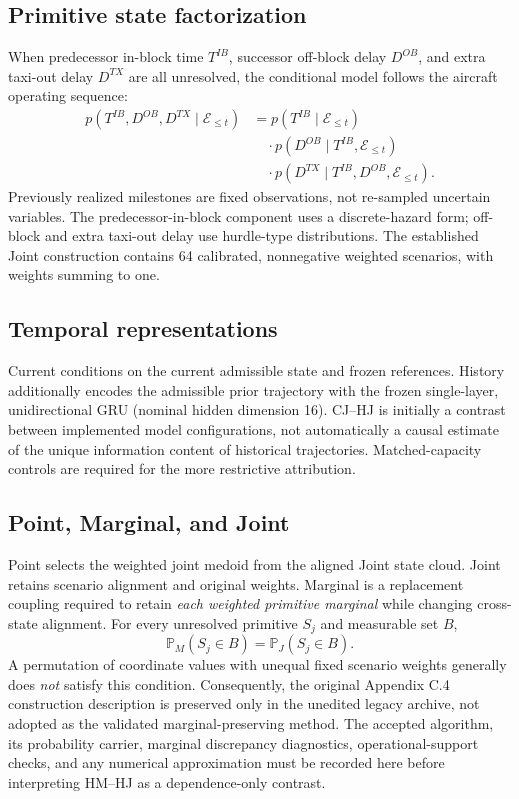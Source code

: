 \documentclass[10pt,a4paper]{article}
\newcommand{\Prob}{\mathbb P}
\numberwithin{equation}{section}
\begin{document}
\subsection{Primitive state factorization}
When predecessor in-block time $T^{IB}$, successor off-block delay $D^{OB}$, and extra taxi-out delay $D^{TX}$ are all unresolved, the conditional model follows the aircraft operating sequence:
\begin{equation}
\begin{aligned}
p(T^{IB},D^{OB},D^{TX}\mid\mathcal E_{\le t})
&=p(T^{IB}\mid\mathcal E_{\le t})\\
&\quad\cdot p(D^{OB}\mid T^{IB},\mathcal E_{\le t})\\
&\quad\cdot p(D^{TX}\mid T^{IB},D^{OB},\mathcal E_{\le t}).
\end{aligned}\label{eq:sup_state_factorization}
\end{equation}
Previously realized milestones are fixed observations, not re-sampled uncertain variables. The predecessor-in-block component uses a discrete-hazard form; off-block and extra taxi-out delay use hurdle-type distributions. The established Joint construction contains 64 calibrated, nonnegative weighted scenarios, with weights summing to one.

\subsection{Temporal representations}
Current conditions on the current admissible state and frozen references. History additionally encodes the admissible prior trajectory with the frozen single-layer, unidirectional GRU (nominal hidden dimension 16). CJ--HJ is initially a contrast between implemented model configurations, not automatically a causal estimate of the unique information content of historical trajectories. Matched-capacity controls are required for the more restrictive attribution.

\subsection{Point, Marginal, and Joint}
Point selects the weighted joint medoid from the aligned Joint state cloud. Joint retains scenario alignment and original weights. Marginal is a replacement coupling required to retain \emph{each weighted primitive marginal} while changing cross-state alignment. For every unresolved primitive $S_j$ and measurable set $B$,
\begin{equation}
\Prob_M(S_j\in B)=\Prob_J(S_j\in B).
\label{eq:sup_weighted_marginals}
\end{equation}
A permutation of coordinate values with unequal fixed scenario weights generally does \emph{not} satisfy this condition. Consequently, the original Appendix C.4 construction description is preserved only in the unedited legacy archive, not adopted as the validated marginal-preserving method. The accepted algorithm, its probability carrier, marginal discrepancy diagnostics, operational-support checks, and any numerical approximation must be recorded here before interpreting HM--HJ as a dependence-only contrast.
\end{document}
